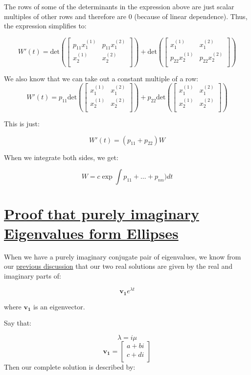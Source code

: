 \documentclass{report}
\begin{document}
The rows of some of the determinants in the expression above are just scalar multiples of other rows and therefore are 0 (because of linear dependence). Thus, the expression simplifies to:

$$
W'(t) =
\text{det}\left(
\begin{bmatrix}
    p_{11}x_1^{(1)} & p_{11}x_1^{(2)} \\
    x_2^{(1)} & x_2^{(2)} \\
\end{bmatrix}\right)
+
\text{det}\left(
\begin{bmatrix}
    x_1^{(1)} & x_1^{(2)} \\
    p_{22}x_2^{(1)} &  p_{22}x_2^{(2)} \\
\end{bmatrix}\right)
$$

We also know that we can take out a constant multiple of a row:
$$
W'(t) =
p_{11}
\text{det}\left(
\begin{bmatrix}
    x_1^{(1)} & x_1^{(2)} \\
    x_2^{(1)} & x_2^{(2)} \\
\end{bmatrix}\right)
+
p_{22}
\text{det}\left(
\begin{bmatrix}
    x_1^{(1)} & x_1^{(2)} \\
    x_2^{(1)} &  x_2^{(2)} \\
\end{bmatrix}\right)
$$

This is just:

$$W'(t) = (p_{11} + p_{22})W$$

When we integrate both sides, we get:

$$W = c\exp{\int{p_{11} + \dots + p_{nn})dt}}$$


\section{\hyperref[sec:center]{Proof that purely imaginary Eigenvalues form Ellipses}}
\label{sec:prCenter}

When we have a purely imaginary conjugate pair of eigenvalues, we know from our \hyperref[th:compEigenvals]{previous discussion} that our two real solutions are given by the real and imaginary parts of:

$$\mathbf{v_1}e^{\lambda t}$$

where $\mathbf{v_1}$ is an eigenvector.

Say that:

$$\lambda = i\mu$$
$$\mathbf{v_1}
= \begin{bmatrix}
    a + bi \\
    c + di \\
\end{bmatrix}$$
Then our complete solution is described by:
\end{document}
